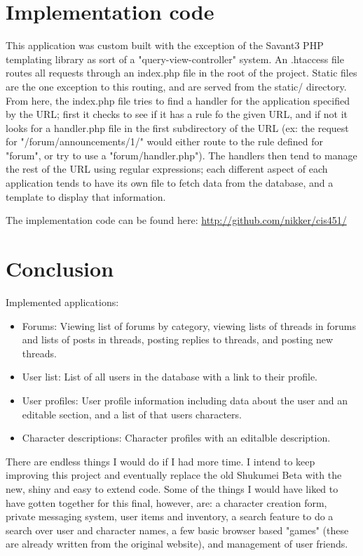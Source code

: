 \documentclass{book}
\begin{document}
\section{Implementation code}
This application was custom built with the exception of the Savant3 PHP templating library as sort of a "query-view-controller" system.  An .htaccess file routes all requests through an index.php file in the root of the project.  Static files are the one exception to this routing, and are served from the static/ directory.  From here, the index.php file tries to find a handler for the application specified by the URL; first it checks to see if it has a rule fo the given URL, and if not it looks for a handler.php file in the first subdirectory of the URL (ex: the request for "/forum/announcements/1/" would either route to the rule defined for "forum", or try to use a "forum/handler.php").  The handlers then tend to manage the rest of the URL using regular expressions; each different aspect of each application tends to have its own file to fetch data from the database, and a template to display that information.

The implementation code can be found here: \url{http://github.com/nikker/cis451/}

\newpage
\section{Conclusion}
Implemented applications:
\begin{itemize}
	\item Forums: Viewing list of forums by category, viewing lists of threads in forums and lists of posts in threads, posting replies to threads, and posting new threads.
	\item User list: List of all users in the database with a link to their profile.
	\item User profiles: User profile information including data about the user and an editable section, and a list of that users characters.
	\item Character descriptions:  Character profiles with an editalble description.
\end{itemize}

There are endless things I would do if I had more time.  I intend to keep improving this project and eventually replace the old Shukumei Beta with the new, shiny and easy to extend code.
Some of the things I would have liked to have gotten together for this final, however, are: a character creation form, private messaging system, user items and inventory, a search feature to do a search over user and character names, a few basic browser based "games" (these are already written from the original website), and management of user friends.
\end{document}
